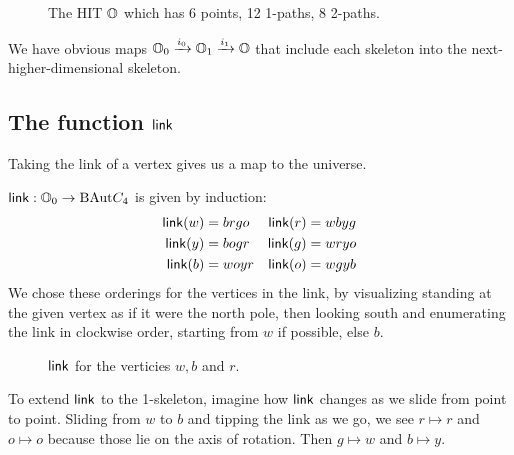 \begin{figure}[htbp]
\centering

\caption{The HIT \( \mathbb{O} \) which has 6 points, 12 1-paths, 8 2-paths.}
\end{figure}

We have obvious maps \( \mathbb{O}_0\xrightarrow[]{i_0} \mathbb{O}_1\xrightarrow[]{i_1} \mathbb{O} \) that include each skeleton into the next-higher-dimensional skeleton.

\subsection{The function \texorpdfstring{\( \mathsf{link} \)}{link}}

Taking the link of a vertex gives us a map to the universe.

\begin{mydef}
\( \mathsf{link}:\mathbb{O}_0\to\mathrm{BAut} C_4 \) is given by induction:
\begin{align*}
\mathsf{link}(w) &= brgo & \mathsf{link}(r) &= wbyg \\
\mathsf{link}(y) &= bogr & \mathsf{link}(g) &= wryo \\
\mathsf{link}(b) &= woyr & \mathsf{link}(o) &= wgyb
\end{align*}
We chose these orderings for the vertices in the link, by visualizing standing at the given vertex as if it were the north pole, then looking south and enumerating the link in clockwise order, starting from \( w \) if possible, else \( b \).
\end{mydef}

\begin{figure}[htbp]
\centering

\caption{\( \mathsf{link} \) for the verticies \( w, b\) and \( r \).}
\label{fig:triangle_of_equators}
\end{figure}

To extend \( \mathsf{link} \) to the 1-skeleton, imagine how \( \mathsf{link} \) changes as we slide from point to point. Sliding from \( w \) to \( b \) and tipping the link as we go, we see \( r\mapsto r \) and \( o\mapsto o \) because those lie on the axis of rotation. Then \( g\mapsto w \) and \( b\mapsto y \). 

